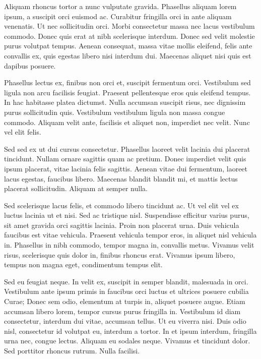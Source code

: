 Aliquam rhoncus tortor a nunc vulputate gravida. Phasellus aliquam lorem ipsum, a suscipit orci euismod ac. Curabitur fringilla orci in ante aliquam venenatis. Ut nec sollicitudin orci. Morbi consectetur massa nec lacus vestibulum commodo. Donec quis erat at nibh scelerisque interdum. Donec sed velit molestie purus volutpat tempus. Aenean consequat, massa vitae mollis eleifend, felis ante convallis ex, quis egestas libero nisi interdum dui. Maecenas aliquet nisi quis est dapibus posuere.

Phasellus lectus ex, finibus non orci et, suscipit fermentum orci. Vestibulum sed ligula non arcu facilisis feugiat. Praesent pellentesque eros quis eleifend tempus. In hac habitasse platea dictumst. Nulla accumsan suscipit risus, nec dignissim purus sollicitudin quis. Vestibulum vestibulum ligula non massa congue commodo. Aliquam velit ante, facilisis et aliquet non, imperdiet nec velit. Nunc vel elit felis.

Sed sed ex ut dui cursus consectetur. Phasellus laoreet velit lacinia dui placerat tincidunt. Nullam ornare sagittis quam ac pretium. Donec imperdiet velit quis ipsum placerat, vitae lacinia felis sagittis. Aenean vitae dui fermentum, laoreet lacus egestas, faucibus libero. Maecenas blandit blandit mi, et mattis lectus placerat sollicitudin. Aliquam at semper nulla.

Sed scelerisque lacus felis, et commodo libero tincidunt ac. Ut vel elit vel ex luctus lacinia ut et nisi. Sed ac tristique nisl. Suspendisse efficitur varius purus, sit amet gravida orci sagittis lacinia. Proin non placerat urna. Duis vehicula faucibus est vitae vehicula. Praesent vehicula tempor eros, in aliquet nisl vehicula in. Phasellus in nibh commodo, tempor magna in, convallis metus. Vivamus velit risus, scelerisque quis dolor in, finibus rhoncus erat. Vivamus ipsum libero, tempus non magna eget, condimentum tempus elit.

Sed eu feugiat neque. In velit ex, suscipit in semper blandit, malesuada in orci. Vestibulum ante ipsum primis in faucibus orci luctus et ultrices posuere cubilia Curae; Donec sem odio, elementum at turpis in, aliquet posuere augue. Etiam accumsan libero lorem, tempor cursus purus fringilla in. Vestibulum id diam consectetur, interdum dui vitae, accumsan tellus. Ut eu viverra nisi. Duis odio nisl, consectetur id volutpat eu, interdum a tortor. In et ipsum interdum, fringilla urna nec, congue lectus. Aliquam eu sodales neque. Vivamus et tincidunt dolor. Sed porttitor rhoncus rutrum. Nulla facilisi.

